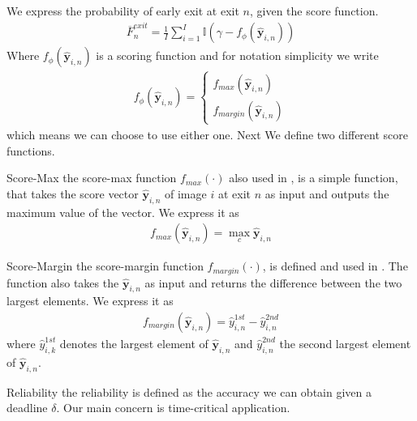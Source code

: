 \begin{enumdescript}
		We express the probability of early exit at exit $ n $, given the score function. 
		\begin{align}
		\overline{F}^{exit}_n = \frac{1}{I}\sum_{i=1}^{I} \mathbb{I} \left(\gamma-f_{\phi}\left(\bm{\hat{y}}_{i,n}\right) \right)
		\end{align}
		Where $ f_\phi\left(\bm{\hat{y}}_{i,n}\right) $ is a scoring function and for notation simplicity we write 
		\begin{align}
			f_{\phi}\left(\bm{\hat{y}}_{i,n}\right) = \begin{cases}
			 	f_{max}\left(\bm{\hat{y}}_{i,n}\right)\\
			 	f_{margin}\left(\bm{\hat{y}}_{i,n}\right)
			\end{cases}
		\end{align}
		which means we can choose to use either one. Next We define two different score functions.
		
		\begin{enumdescript}
			\item[Score-Max] the score-max function $ f_{max}(\cdot)$ also used in \cite{leroux_resource-constrained_2015}, is a simple function, that takes the score vector $ \bm{\hat{y}}_{i,n} $ of image $ i $ at exit $ n $ as input and outputs the maximum value of the vector. We express it as 
			\begin{align}
			f_{max}\left(\bm{\hat{y}}_{i,n}\right) = \underset{c}{\max} \bm{\hat{y}}_{i,n}
			\end{align}
			\item[Score-Margin] the score-margin function $ f_{margin}(\cdot)$, is defined and used in \cite{park_big/little_2015}. The function also takes the $ \bm{\hat{y}}_{i,n} $ as input and returns the difference between the two largest elements. We express it as
			\begin{align}
			f_{margin}\left(\bm{\hat{y}}_{i,n}\right) = \hat{y}_{i,n}^{1st} - \hat{y}_{i,n}^{2nd} \label{eq:f_margin}
			\end{align}
			where $ \hat{y}_{i,k}^{1st} $ denotes the largest element of $ \bm{\hat{y}}_{i,n} $ 
			and $ \hat{y}_{i,n}^{2nd} $ the second largest element of $ \bm{\hat{y}}_{i,n} $.
			
		\end{enumdescript}
	
	\item[Reliability] the reliability is defined as the accuracy we can obtain given a deadline $ \delta $. Our main concern is time-critical application.
	

\end{enumdescript}
